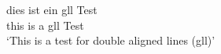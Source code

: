 \ea
 \gll dies ist ein gll Test\\
      this is a gll Test\\
 \glt `This is a test for double aligned lines (gll)'
\z